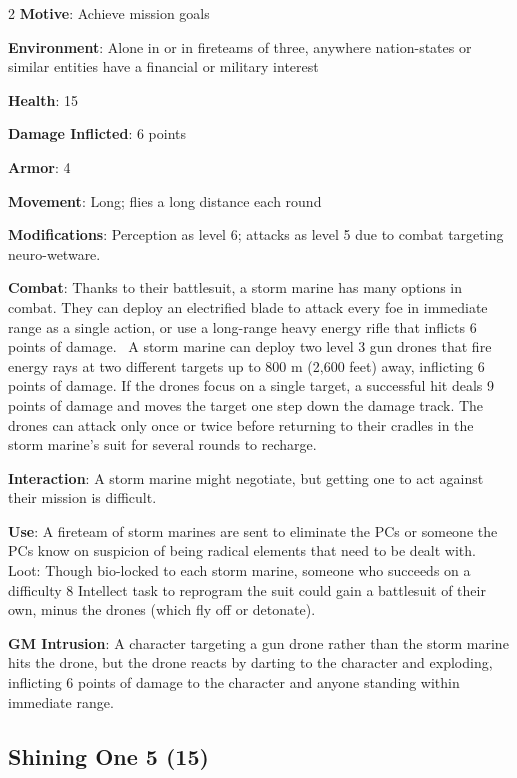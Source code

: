 \begin{multicols}{2}
\textbf{Motive}: Achieve mission goals 

\textbf{Environment}: Alone in or in fireteams of three, anywhere nation-states or similar entities have a financial or military interest 

\textbf{Health}: 15 

\textbf{Damage Inflicted}: 6 points 

\textbf{Armor}: 4 

\textbf{Movement}: Long; flies a long distance each round 

\textbf{Modifications}: Perception as level 6; attacks as level 5 due to combat targeting neuro-wetware. 

\textbf{Combat}: Thanks to their battlesuit, a storm marine has many options in combat. They can deploy an electrified blade to attack every foe in immediate range as a single action, or use a long-range heavy energy rifle that inflicts 6 points of damage. 
A storm marine can deploy two level 3 gun drones that fire energy rays at two different targets up to 800 m (2,600 feet) away, inflicting 6 points of damage. If the drones focus on a single target, a successful hit deals 9 points of damage and moves the target one step down the damage track. The drones can attack only once or twice before returning to their cradles in the storm marine’s suit for several rounds to recharge. 

\textbf{Interaction}: A storm marine might negotiate, but getting one to act against their mission is difficult. 

\textbf{Use}: A fireteam of storm marines are sent to eliminate the PCs or someone the PCs know on suspicion of being radical elements that need to be dealt with. 
Loot: Though bio-locked to each storm marine, someone who succeeds on a difficulty 8 Intellect task to reprogram the suit could gain a battlesuit of their own, minus the drones (which fly off or detonate).

\textbf{GM Intrusion}: A character targeting a gun drone rather than the storm marine hits the drone, but the drone reacts by darting to the character and exploding, inflicting 6 points of damage to the character and anyone standing within immediate range.

\subsection{Shining One 5 (15)}


\end{multicols}
